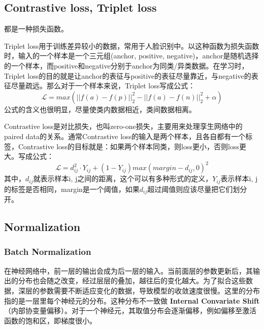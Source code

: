 \subsection{Contrastive loss, Triplet loss} 
都是一种损失函数。

Triplet loss用于训练差异较小的数据，常用于人脸识别中。以这种函数为损失函数时，输入的一个样本是一个三元组(anchor, positive, negative)，anchor是随机选择的一个样本，而positive和negative分别于anchor为同类/异类数据。在学习时，Triplet loss的目的就是让anchor的表征与positive的表征尽量靠近，与negative的表征尽量疏远。那么对于一个样本来说，Triplet loss写成公式： 
$$
\mathcal{L} = max( ||f(a)-f(p)||_2^2 - ||f(a) - f(n)||_2^2 + \alpha )
$$
公式的含义也很明显，尽量使类内数据相近，类间数据相离。

Contrastive loss是对比损失，也叫zero-one损失，主要用来处理孪生网络中的paired data的关系。通常Contrastive loss的输入是两个样本，且各自都有一个标签，Contrastive loss的目标就是：如果两个样本同类，则loss更小，否则loss更大。写成公式：
$$
\mathcal{L} = d_{ij}^2 \cdot Y_{ij} + (1 - Y_{ij} )max(margin - d_{ij}, 0)^2
$$
其中，$d_{ij}$就表示样本i, j之间的距离，这个可以有多种形式的定义，$Y_{ij}$表示样本i, j的标签是否相同，margin是一个阈值，如果$d_{ij}$超过阈值则应该尽量把它们划分开。

\subsection{Normalization}
\subsubsection{Batch Normalization}
在神经网络中，前一层的输出会成为后一层的输入。当前面层的参数更新后，其输出的分布也会随之改变，经过层层的叠加，越往后的变化越大。为了拟合这些数据，深层的参数需要不断适应变化的数据，导致模型的收敛速度很慢。这里的分布指的是一层里每个神经元的分布。这种分布不一致做 \textbf{Internal Convariate Shift}（内部协变量偏移）。对于一个神经元，其取值分布会逐渐偏移，例如偏移至激活函数的饱和区，即梯度很小。

